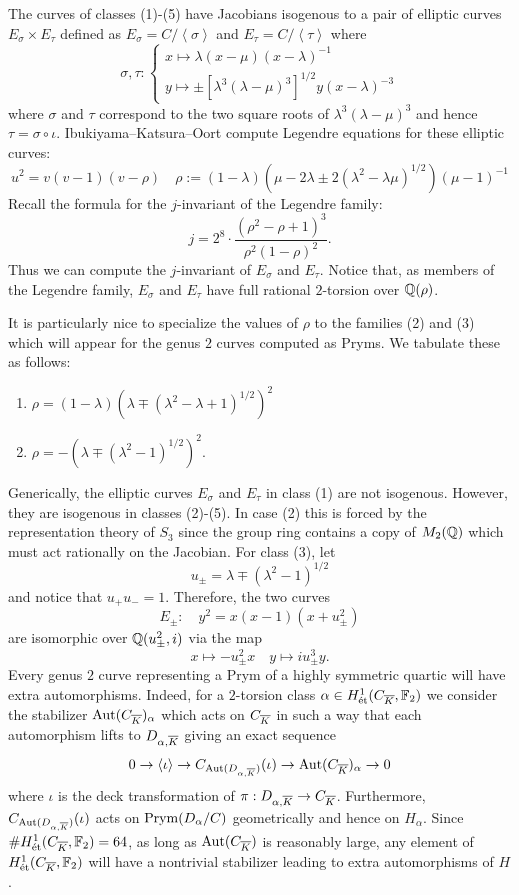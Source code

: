 \documentclass[main.tex]{subfiles}
\begin{document}
The curves of classes (1)-(5) have Jacobians isogenous to a pair of elliptic curves $E_{\sigma} \times E_{\tau}$ defined as $E_\sigma = C / \left< \sigma \right>$ and $E_{\tau} = C / \left< \tau \right>$ where
\[ \sigma, \tau : 
\begin{cases}
x \mapsto \lambda (x - \mu) (x - \lambda)^{-1}
\\
y \mapsto \pm [\lambda^3 (\lambda - \mu)^3]^{1/2} y (x - \lambda)^{-3} 
\end{cases}  \]
where $\sigma$ and $\tau$ correspond to the two square roots of $\lambda^3 (\lambda - \mu)^3$ and hence $\tau = \sigma \circ \iota$. Ibukiyama--Katsura--Oort compute Legendre equations \cite[Equation (1.13)]{Ibukiyama-Katsura-Oort} for these elliptic curves:
\[ u^2 = v(v-1)(v - \rho) \quad \rho := (1 - \lambda)(\mu - 2 \lambda \pm 2 (\lambda^2 - \lambda \mu)^{1/2}) (\mu-1)^{-1} \]
Recall the formula for the $j$-invariant of the Legendre family:
\[ j = 2^8 \cdot \frac{(\rho^2 - \rho + 1)^3}{\rho^2 (1 - \rho)^2}. \]
Thus we can compute the $j$-invariant of $E_{\sigma}$ and $E_{\tau}$. Notice that, as members of the Legendre family, $E_{\sigma}$ and $E_{\tau}$ have full rational $2$-torsion over $\mathbb{Q}(\rho)$. 
\par 
It is particularly nice to specialize the values of $\rho$ to the families (2) and (3) which will appear for the genus $2$ curves computed as Pryms. We tabulate these as follows:
\begin{enumerate}
\item[(2)] $\rho = (1-\lambda)(\lambda \mp (\lambda^2 - \lambda + 1)^{1/2})^2$
\item[(3)] $\rho = -(\lambda \mp (\lambda^2 - 1)^{1/2})^2$.
\end{enumerate}
Generically, the elliptic curves $E_{\sigma}$ and $E_{\tau}$ in class (1) are not isogenous. However, they are isogenous in classes (2)-(5). In case (2) this is forced by the representation theory of $S_3$ since the group ring contains a copy of $M_2(\mathbb{Q})$ which must act rationally on the Jacobian.
For class (3), let 
\[ u_{\pm} = \lambda \mp (\lambda^2 - 1)^{1/2} \]
and notice that $u_{+} u_{-} = 1$. Therefore, the two curves 
\[ E_{\pm} : \quad y^2 = x(x-1)(x + u_{\pm}^2) \]
are isomorphic over $\mathbb{Q}(u_{\pm}^2, i)$ via the map
\[ x \mapsto -u_{\pm}^2 x \quad y \mapsto i u_{\pm}^{3} y. \]
Every genus $2$ curve representing a Prym of a highly symmetric quartic will have extra automorphisms. Indeed, for a $2$-torsion class $\alpha \in H^1_{\mathrm{\acute{e}t}}(C_{\overline{K}}, \mathbb{F}_2)$ we consider the stabilizer $\operatorname{\mathrm{Aut}}(C_{\overline{K}})_{\alpha}$ which acts on $C_{\overline{K}}$ in such a way that each automorphism lifts to $D_{\alpha, \overline{K}}$ giving an exact sequence
\[ 0 \to \left< \iota \right> \to C_{\operatorname{\mathrm{Aut}}(D_{\alpha, \overline{K}})}(\iota) \to \operatorname{\mathrm{Aut}}(C_{\overline{K}})_{\alpha} \to 0 \]
where $\iota$ is the deck transformation of $\pi : D_{\alpha, \overline{K}} \to C_{\overline{K}}$.
Furthermore, $C_{\operatorname{\mathrm{Aut}}(D_{\alpha, \overline{K}})}(\iota)$ acts on $\operatorname{\mathrm{Prym}}(D_{\alpha}/C)$ geometrically and hence on $H_{\alpha}$. Since $\# H^1_{\mathrm{\acute{e}t}}(C_{\overline{K}}, \mathbb{F}_2) = 64$, as long as $\operatorname{\mathrm{Aut}}(C_{\overline{K}})$ is reasonably large, any element of $H^1_{\mathrm{\acute{e}t}}(C_{\overline{K}}, \mathbb{F}_2)$ will have a nontrivial stabilizer leading to extra automorphisms of $H$. 
\end{document}
